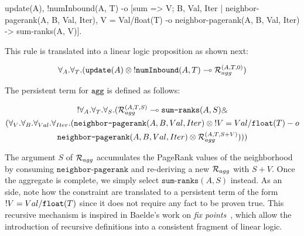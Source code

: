 \begin{Code}
  update(A),
  !numInbound(A, T)
     -o [sum => V; B, Val, Iter | neighbor-pagerank(A, B, Val, Iter), V =
           Val/float(T) -o neighbor-pagerank(A, B, Val, Iter) -> sum-ranks(A, V)].
\end{Code}

This rule is translated into a linear logic proposition as shown next:

\begin{align}
\forall_{A}. \forall_{T}. (\texttt{update}(A) \otimes {!} \texttt{numInbound}(A, T) \multimap
\mathcal{R}_{agg}^{(A, T, 0)})
\end{align}

The persistent term for $\texttt{agg}$ is defined as follows:

\begin{multline}
{!} \forall_A. \forall_T. \forall_S. (\mathcal{R}_{agg}^{(A, T, S)} \multimap \texttt{sum-ranks}(A, S) \mathbin{\binampersand}\\
(\forall_V. \forall_B. \forall_{Val}. \forall_{Iter}.
   (\texttt{neighbor-pagerank}(A, B, Val, Iter) \otimes {!} V = Val/\texttt{float}(T) -o \\\texttt{neighbor-pagerank}(A, B, Val, Iter) \otimes \mathcal{R}_{agg}^{(A, T, S + V)})))
\end{multline}

The argument $S$ of $\mathcal{R}_{agg}$ accumulates the PageRank values of the
neighborhood by consuming $\texttt{neighbor-pagerank}$ and re-deriving a new
$\mathcal{R}_{agg}$ with $S + V$. Once the aggregate is complete, we simply select
$\texttt{sum-ranks}(A, S)$ instead. As an side, note how the constraint are
translated to a persistent term of the form ${!} V = Val/\texttt{float}(T)$
since it does not require any fact to be proven true. This recursive mechanism
is inspired in Baelde's work on \emph{fix points}~\cite{BaeldeM07,Baelde:2012}, which allow
the introduction of recursive definitions into a consistent fragment of linear
logic.
